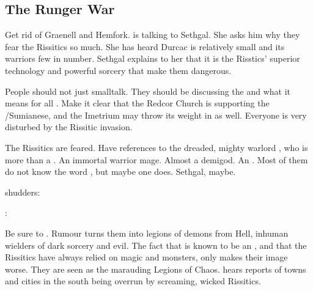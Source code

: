 \subsection{The Runger War}
\begin{changes}
  \begin{comment}\paragraph{Daggers and \Daemons}\end{comment}
    Get rid of Graenell and Hemfork. 
    \Tiroco is talking to Sethgal.
    She asks him why they fear the Rissitics so much. 
    She has heard Durcac is relatively small and its warriors few in number.
    Sethgal explains to her that it is the Risstics' superior technology and powerful sorcery that make them dangerous.
  
    People should not just smalltalk. 
    They should be discussing the  and what it means for all \Galessan. 
    Make it clear that the Redcor Church is supporting the \Scyrics/Sumianese, and the Imetrium may throw its weight in as well. 
    Everyone is very disturbed by the Rissitic invasion. 
    
    The Rissitics are feared. 
    Have references to the dreaded, mighty warlord \Narkiza, who is more than a \scatha. 
    An immortal warrior mage. 
    Almost a demigod. 
    An . 
    Most of them do not know the word \quo{\Ashenoch}, but maybe one does. 
    Sethgal, maybe. 
    
    \Tiroco{} shudders:
    \begin{prose}
      \Tiroco: 
    \end{prose}

    Be sure to . 
    Rumour turns them into legions of demons from Hell, inhuman wielders of dark sorcery and evil.
    The fact that \Narkiza is known to be an \Ashenoch, and that the Rissitics have always relied on magic and monsters, only makes their image worse.
    They are seen as the marauding Legions of Chaos.
    \Tiroco hears reports of towns and cities in the south being overrun by screaming, wicked Rissitics.

    

\end{changes}
